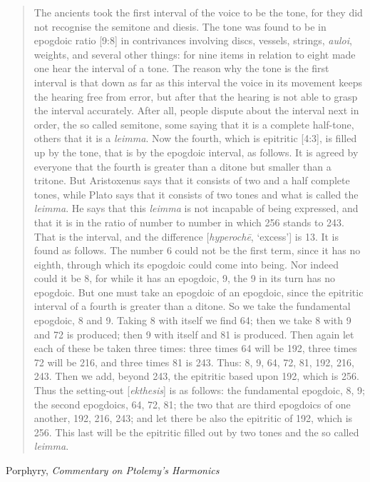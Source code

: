 \documentclass{article}
\theoremstyle{definition}
\begin{document}
\begin{quote}
The ancients took the first interval of the voice to be the tone, for they did
not recognise the semitone and diesis. The tone was found to be in epogdoic
ratio [9:8] in contrivances involving discs, vessels, strings, {\em auloi}, weights, and
several other things: for nine items in relation to eight made one hear the
interval of a tone. The reason why the tone is the first interval is that down as
far as this interval the voice in its movement keeps the hearing free from error,
but after that the hearing is not able to grasp the interval accurately. After all,
people dispute about the interval next in order, the so called semitone, some
saying that it is a complete half-tone, others that it is a {\em leimma}. Now the fourth,
which is epitritic [4:3], is filled up by the tone, that is by the epogdoic interval,
as follows. It is agreed by everyone that the fourth is greater than a ditone but
smaller than a tritone. But Aristoxenus says that it consists of two and a half
complete tones, while Plato says that it consists of two tones and what is called
the {\em leimma}. He says that this {\em leimma} is not incapable of being expressed, and
that it is in the ratio of number to number in which 256 stands to 243. That is
the interval, and the difference [{\em hyperoch\={e}}, `excess'] is 13. It is found as
follows. The number 6 could not be the first term, since it has no eighth,
through which its epogdoic could come into being. Nor indeed could it be 8, for
while it has an epogdoic, 9, the 9 in its turn has no epogdoic. But one must take
an epogdoic of an epogdoic, since the epitritic interval of a fourth is greater
than a ditone. So we take the fundamental epogdoic, 8 and 9. Taking 8 with
itself we find 64; then we take 8 with 9 and 72 is produced; then 9 with itself
and 81 is produced. Then again let each of these be taken three times: three
times 64 will be 192, three times 72 will be 216, and three times 81 is 243. Thus:
8, 9, 64, 72, 81, 192, 216, 243. Then we add, beyond 243, the epitritic based
upon 192, which is 256. Thus the setting-out [{\em ekthesis}] is as follows: the
fundamental epogdoic, 8, 9; the second epogdoics, 64, 72, 81; the two that are
third epogdoics of one another, 192, 216, 243; and let there be also the epitritic
of 192, which is 256. This last will be the epitritic filled out by two tones and
the so called {\em leimma}.
\end{quote}

Porphyry, {\em Commentary on Ptolemy's Harmonics} \cite{porphyry}
\end{document}
